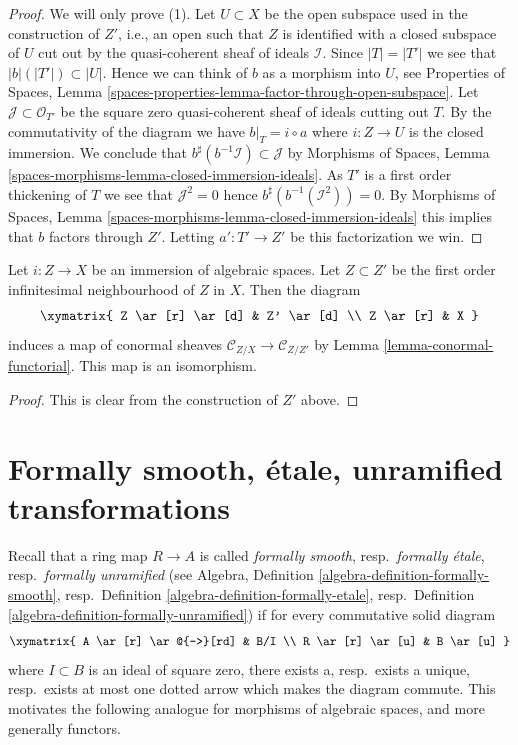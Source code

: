 \begin{proof}
We will only prove (1).
Let $U \subset X$ be the open subspace used in the construction of $Z'$,
i.e., an open such that $Z$ is identified with a closed subspace of $U$
cut out by the quasi-coherent sheaf of ideals $\mathcal{I}$.
Since $|T| = |T'|$ we see that $|b|(|T'|) \subset |U|$. Hence we can
think of $b$ as a morphism into $U$, see
Properties of Spaces,
Lemma \ref{spaces-properties-lemma-factor-through-open-subspace}.
Let $\mathcal{J} \subset \mathcal{O}_{T'}$
be the square zero quasi-coherent sheaf of ideals cutting out $T$.
By the commutativity of the diagram we have $b|_T = i \circ a$ where
$i : Z \to U$ is the closed immersion. We conclude that
$b^\sharp(b^{-1}\mathcal{I}) \subset \mathcal{J}$ by
Morphisms of Spaces,
Lemma \ref{spaces-morphisms-lemma-closed-immersion-ideals}.
As $T'$ is a first order thickening of $T$ we see that $\mathcal{J}^2 = 0$
hence $b^\sharp(b^{-1}(\mathcal{I}^2)) = 0$. By
Morphisms of Spaces, Lemma \ref{spaces-morphisms-lemma-closed-immersion-ideals}
this implies that $b$ factors through $Z'$. Letting $a' : T' \to Z'$
be this factorization we win.
\end{proof}

\begin{lemma}
\label{lemma-infinitesimal-neighbourhood-conormal}
Let $i : Z \to X$ be an immersion of algebraic spaces.
Let $Z \subset Z'$ be the first order infinitesimal neighbourhood
of $Z$ in $X$. Then the diagram
$$
\xymatrix{
Z \ar[r] \ar[d] & Z' \ar[d] \\
Z \ar[r] & X
}
$$
induces a map of conormal sheaves
$\mathcal{C}_{Z/X} \to \mathcal{C}_{Z/Z'}$ by
Lemma \ref{lemma-conormal-functorial}.
This map is an isomorphism.
\end{lemma}

\begin{proof}
This is clear from the construction of $Z'$ above.
\end{proof}





\section{Formally smooth, \'etale, unramified transformations}
\label{section-formally-smooth-etale-unramified}

\noindent
Recall that a ring map $R \to A$ is called
{\it formally smooth}, resp.\ {\it formally \'etale},
resp.\ {\it formally unramified}
(see Algebra, Definition \ref{algebra-definition-formally-smooth},
resp.\ Definition \ref{algebra-definition-formally-etale},
resp.\ Definition \ref{algebra-definition-formally-unramified})
if for every commutative solid diagram
$$
\xymatrix{
A \ar[r] \ar@{-->}[rd] & B/I \\
R \ar[r] \ar[u] & B \ar[u]
}
$$
where $I \subset B$ is an ideal of square zero, there
exists a, resp.\ exists a unique, resp.\ exists at most one dotted
arrow which makes the diagram commute. This motivates
the following analogue for morphisms of algebraic spaces, and more
generally functors.

